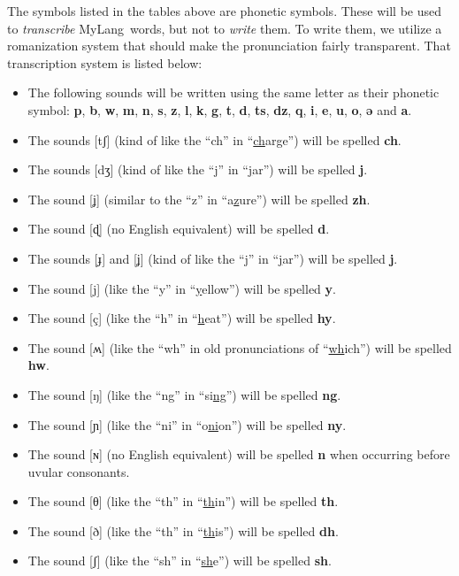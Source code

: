 \documentclass[oneside]{book}
\newcommand{\LanguageName}{MyLang}
\begin{document}
The symbols listed in the tables above are phonetic symbols.
These will be used to \emph{transcribe} \LanguageName\ words, but not to \emph{write} them.
To write them, we utilize a romanization system that should make the pronunciation fairly transparent.
That transcription system is listed below:

\begin{itemize}
\item
The following sounds will be written using the same letter as their phonetic symbol:
\textbf{p}, \textbf{b}, \textbf{w}, \textbf{m}, \textbf{n}, \textbf{s}, \textbf{z}, \textbf{l}, \textbf{k}, \textbf{g}, \textbf{t}, \textbf{d}, \textbf{ts}, \textbf{dz}, \textbf{q}, \textbf{i}, \textbf{e}, \textbf{u}, \textbf{o}, \textbf{ǝ} and \textbf{a}.
\item
The sounds [tʃ] (kind of like the ``ch'' in ``\uline{ch}arge'') will be spelled \textbf{ch}.
\item
The sounds [dʒ] (kind of like the ``j'' in ``\uline{j}ar'') will be spelled \textbf{j}.
\item
The sound [ʝ] (similar to the ``z'' in ``a\uline{z}ure'') will be spelled \textbf{zh}.
\item
The sound [ɖ] (no English equivalent) will be spelled \textbf{d}.
\item
The sounds [ɟ] and [ʝ] (kind of like the ``j'' in ``\uline{j}ar'') will be spelled \textbf{j}.
\item
The sound [j] (like the ``y'' in ``\uline{y}ellow'') will be spelled \textbf{y}.
\item
The sound [ç] (like the ``h'' in ``\uline{h}eat'') will be spelled \textbf{hy}.
\item
The sound [ʍ] (like the ``wh'' in old pronunciations of ``\uline{wh}ich'') will be spelled \textbf{hw}.
\item
The sound [ŋ] (like the ``ng'' in ``si\uline{ng}'') will be spelled \textbf{ng}.
\item
The sound [ɲ] (like the ``ni'' in ``o\uline{ni}on'') will be spelled \textbf{ny}.
\item
The sound [ɴ] (no English equivalent) will be spelled \textbf{n} when occurring before uvular consonants.
\item
The sound [θ] (like the ``th'' in ``\uline{th}in'') will be spelled \textbf{th}.
\item
The sound [ð] (like the ``th'' in ``\uline{th}is'') will be spelled \textbf{dh}.
\item
The sound [ʃ] (like the ``sh'' in ``\uline{sh}e'') will be spelled \textbf{sh}.

\end{itemize}
\end{document}
